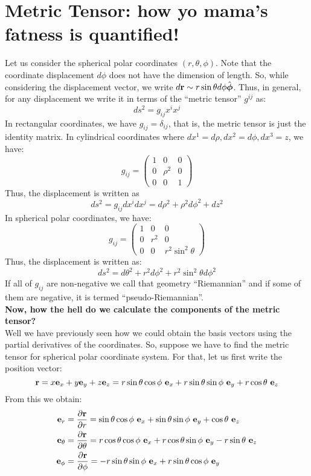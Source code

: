 \section{Metric Tensor: how yo mama's fatness is quantified!}
Let us consider the spherical polar coordinates $(r,\theta,\phi)$. Note that the coordinate displacement $d\phi$ does not have the dimension of length. So, while considering the displacement vector, we write $d\boldsymbol{\mathbf{r}} \sim r\sin\theta d\phi \hat{\boldsymbol{\mathbf{\phi}}}$. Thus, in general, for any displacement we write it in terms of the ``metric tensor'' $g^{ij}$ as:
$$ds^2 = g_{ij}x^ix^j$$
In rectangular coordinates, we have $g_{ij} = \delta_{ij}$, that is, the metric tensor is just the identity matrix. In cylindrical coordinates where $dx^1 = d\rho, dx^2 = d\phi, dx^3 = z$, we have:
$$g_{ij}= \begin{pmatrix}
    1 & 0 & 0\\
    0 & \rho^2 & 0\\
    0 & 0 & 1
\end{pmatrix}$$
Thus, the displacement is written as
$$ds^2 = g_{ij}dx^i dx^j = d\rho^2 + \rho^2 d\phi^2 + dz^2$$
In spherical polar coordinates, we have:
$$g_{ij} = \begin{pmatrix}
    1 & 0 & 0\\
    0 & r^2 & 0\\
    0 & 0 & r^2\sin^2\theta
\end{pmatrix}$$
Thus, the displacement is written as:
$$ds^2 = d\theta^2 + r^2 d\phi^2 + r^2\sin^2\theta d\phi^2$$
If all of $g_{ij}$ are non-negative we call that geometry ``Riemannian'' and if some of them are negative, it is termed ``pseudo-Riemannian''.\\[0.3cm]
\textbf{Now, how the hell do we calculate the components of the metric tensor?}\\[0.3cm]
Well we have previously seen how we could obtain the basis vectors using the partial derivatives of the coordinates. So, suppose we have to find the metric tensor for spherical polar coordinate system. For that, let us first write the position vector:
$$\veb{r} = x \veb{e}_x+y \veb{e}_y+z \veb{e}_z = r \sin\theta \cos\phi \ \veb{e}_x + r \sin\theta \sin\phi \ \veb{e}_y + r \cos\theta \ \veb{e}_z$$
From this we obtain:
\begin{align*}
    \veb{e}_r &= \pdv{\veb{r}}{r} =  \sin\theta \cos\phi \ \veb{e}_x + \sin\theta \sin\phi \ \veb{e}_y + \cos\theta \ \veb{e}_z\\
    \veb{e}_\theta &= \pdv{\veb{r}}{\theta} = r \cos\theta \cos\phi \ \veb{e}_x + r \cos\theta \sin\phi \ \veb{e}_y - r \sin\theta \ \veb{e}_z\\
    \veb{e}_\phi &= \pdv{\veb{r}}{\phi} = -r \sin\theta \sin\phi \ \veb{e}_x + r \sin\theta \cos\phi \ \veb{e}_y
\end{align*}
